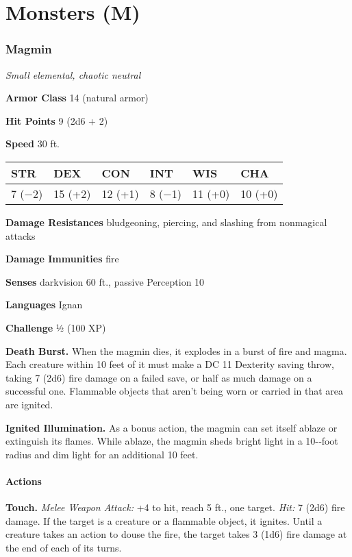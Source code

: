 \documentclass[
]{article}
\date{}
\begin{document}
\hypertarget{monsters-m}{%
\section{Monsters (M)}\label{monsters-m}}

\hypertarget{magmin}{%
\subsubsection{Magmin}\label{magmin}}

\emph{Small elemental, chaotic neutral}

\textbf{Armor Class} 14 (natural armor)

\textbf{Hit Points} 9 (2d6 + 2)

\textbf{Speed} 30 ft.

\begin{longtable}[]{@{}llllll@{}}
\toprule
STR & DEX & CON & INT & WIS & CHA\tabularnewline
\midrule
\endhead
7 (−2) & 15 (+2) & 12 (+1) & 8 (−1) & 11 (+0) & 10 (+0)\tabularnewline
\bottomrule
\end{longtable}

\textbf{Damage Resistances} bludgeoning, piercing, and slashing from
nonmagical attacks

\textbf{Damage Immunities} fire

\textbf{Senses} darkvision 60 ft., passive Perception 10

\textbf{Languages} Ignan

\textbf{Challenge} ½ (100 XP)

\textbf{Death Burst.} When the magmin dies, it explodes in a burst of
fire and magma. Each creature within 10 feet of it must make a DC 11
Dexterity saving throw, taking 7 (2d6) fire damage on a failed save, or
half as much damage on a successful one. Flammable objects that aren't
being worn or carried in that area are ignited.

\textbf{Ignited Illumination.} As a bonus action, the magmin can set
itself ablaze or extinguish its flames. While ablaze, the magmin sheds
bright light in a 10-­‐foot radius and dim light for an additional 10
feet.

\hypertarget{actions}{%
\paragraph{Actions}\label{actions}}

\textbf{Touch.} \emph{Melee Weapon Attack:} +4 to hit, reach 5 ft., one
target. \emph{Hit:} 7 (2d6) fire damage. If the target is a creature or
a flammable object, it ignites. Until a creature takes an action to
douse the fire, the target takes 3 (1d6) fire damage at the end of each
of its turns.
\end{document}
